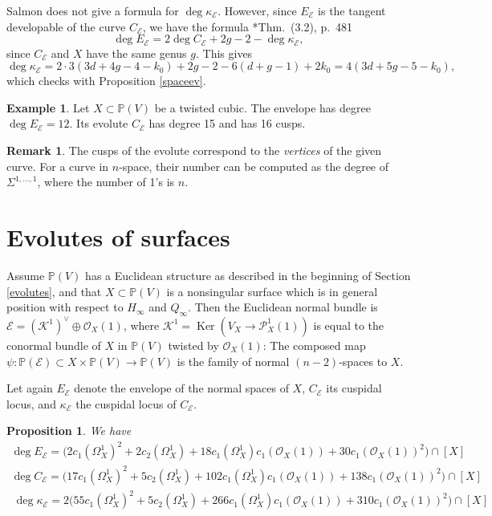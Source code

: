 \documentclass[reqno]{amsart}
\newtheorem{prop}[lemma]{Proposition}
\theoremstyle{definition}
\newtheorem{remark}[lemma]{Remark}
\newtheorem{example}[lemma]{Example}
\theoremstyle{remark}
\DeclareMathOperator{\Ker}{Ker}
\begin{document}
Salmon does not give a formula for $\deg \kappa_\mathcal E$. However, since $E_\mathcal E$ is the tangent developable of the curve $C_\mathcal E$, we have the formula \cite{numchar}*{Thm.~(3.2), p.~481}
\[\deg E_\mathcal E=2\deg C_\mathcal E +2g-2-\deg \kappa_\mathcal E,\]
since $C_\mathcal E$ and $X$ have the same genus $g$.
This gives
\[\deg \kappa_\mathcal E=2\cdot 3(3d+4g-4-k_0)+2g-2 - 6(d+g-1)+2k_0=4(3d+5g-5-k_0),\]
which checks with Proposition \ref{spaceev}.

\begin{example}
Let $X\subset \mathbb P(V)$ be a twisted cubic. 
The envelope has degree $\deg E_\mathcal E=12$. Its evolute $C_\mathcal E$ has degree 15 and has 16 cusps.
\end{example}

\begin{remark}
The cusps of the evolute correspond to the \emph{vertices} of the given curve. For a curve in $n$-space, their number can be computed as the degree of  $\Sigma^{1,\dots,1}$, where the number of 1's is $n$.
\end{remark}

\section{Evolutes of surfaces}\label{polarsurfaces}
Assume $\mathbb P(V)$ has a Euclidean structure as described in the beginning of Section \ref{evolutes}, and that $X\subset \mathbb P(V)$ is a nonsingular surface which is in general position with respect to $H_\infty$ and $Q_\infty$. Then  the Euclidean normal bundle is $\mathcal E=(\mathcal K^1)^\vee\oplus \mathcal O_X(1)$, where  $\mathcal K^1=\Ker (V_X\to \mathcal P^1_X(1))$ is equal to the 
conormal bundle of $X$ in $\mathbb P(V)$ twisted by $\mathcal O_X(1)$:
The composed map $\psi: \mathbb P(\mathcal E)\subset X\times \mathbb P(V) \to \mathbb P(V)$ is the family of normal $(n-2)$-spaces to $X$.

Let again $E_\mathcal E$ denote the envelope of the normal spaces of $X$, $C_\mathcal E$ its cuspidal locus, and $\kappa_\mathcal E$ the cuspidal locus of $C_\mathcal E$.

\begin{prop}\label{polarofsurf}
We have
\begin{multline*}
\deg E_\mathcal E =\bigl(2c_1(\Omega_X^1)^2 +2 c_2(\Omega^1_X) +18c_1(\Omega_X^1)c_1(\mathcal O_X(1))
+ 30 c_1(\mathcal O_X(1))^2 \bigr )\cap [X]\\
\deg C_\mathcal E = \bigl (17 c_1(\Omega_X^1)^2 +5 c_2(\Omega^1_X) +102 c_1(\Omega_X^1)c_1(\mathcal O_X(1)) +138 c_1(\mathcal O_X(1))^2 \bigr )\cap [X]\\\
\deg \kappa_\mathcal E = 2\bigl (55 c_1(\Omega_X^1)^2 +5 c_2(\Omega^1_X) + 266 c_1(\Omega_X^1)c_1(\mathcal O_X(1)) + 310  c_1(\mathcal O_X(1))^2 \bigr )\cap [X]
\end{multline*}
\end{prop}
\end{document}

